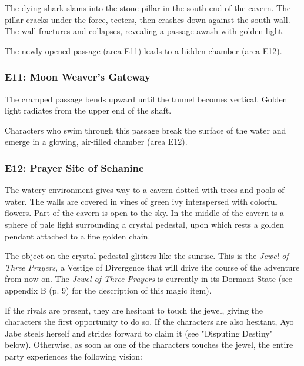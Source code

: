 \documentclass[letterpaper, 11pt, bg=full, twocolumn]{dndbook}
\begin{document}
\begin{DndReadAloud}
The dying shark slams into the stone pillar in the south end of the cavern. The pillar cracks under the force, teeters, then crashes down against the south wall. The wall fractures and collapses, revealing a passage awash with golden light.
\end{DndReadAloud}

The newly opened passage (area E11) leads to a hidden chamber (area E12).

\subsubsection{E11: Moon Weaver's Gateway}

\begin{DndReadAloud}
The cramped passage bends upward until the tunnel becomes vertical. Golden light radiates from the upper end of the shaft.
\end{DndReadAloud}

Characters who swim through this passage break the surface of the water and emerge in a glowing, air-filled chamber (area E12).

\subsubsection{E12: Prayer Site of Sehanine}

\begin{DndReadAloud}
The watery environment gives way to a cavern dotted with trees and pools of water. The walls are covered in vines of green ivy interspersed with colorful flowers. Part of the cavern is open to the sky.
In the middle of the cavern is a sphere of pale light surrounding a crystal pedestal, upon which rests a golden pendant attached to a fine golden chain.
\end{DndReadAloud}

The object on the crystal pedestal glitters like the sunrise. This is the \textit{Jewel of Three Prayers}, a Vestige of Divergence that will drive the course of the adventure from now on. The \textit{Jewel of Three Prayers} is currently in its Dormant State (see appendix B (p. 9) for the description of this magic item).

If the rivals are present, they are hesitant to touch the jewel, giving the characters the first opportunity to do so. If the characters are also hesitant, Ayo Jabe steels herself and strides forward to claim it (see "Disputing Destiny" below). Otherwise, as soon as one of the characters touches the jewel, the entire party experiences the following vision:
\end{document}
